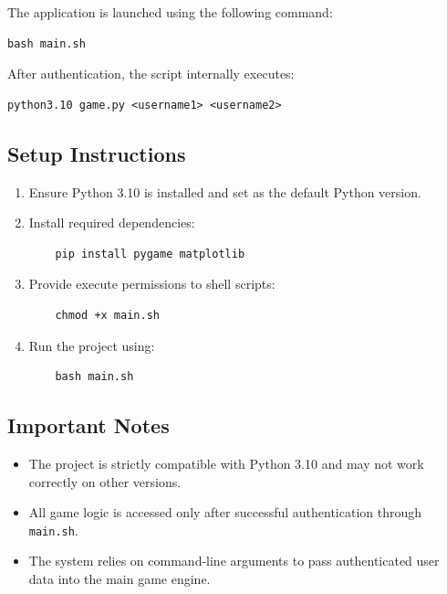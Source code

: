\documentclass[12pt]{article}
\begin{document}
The application is launched using the following command:

\begin{verbatim}
bash main.sh
\end{verbatim}

After authentication, the script internally executes:

\begin{verbatim}
python3.10 game.py <username1> <username2>
\end{verbatim}

\subsection{Setup Instructions}

\begin{enumerate}
    \item Ensure Python 3.10 is installed and set as the default Python version.
    \item Install required dependencies:
    \begin{verbatim}
    pip install pygame matplotlib
    \end{verbatim}

    \item Provide execute permissions to shell scripts:
    \begin{verbatim}
    chmod +x main.sh
    \end{verbatim}

    \item Run the project using:
    \begin{verbatim}
    bash main.sh
    \end{verbatim}
\end{enumerate}

\subsection{Important Notes}

\begin{itemize}
    \item The project is strictly compatible with Python 3.10 and may not work correctly on other versions.
    \item All game logic is accessed only after successful authentication through \texttt{main.sh}.
    \item The system relies on command-line arguments to pass authenticated user data into the main game engine.
\end{itemize}
\end{document}
